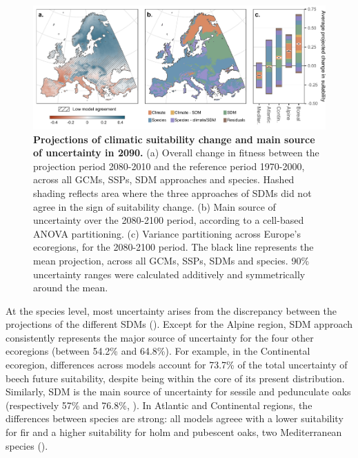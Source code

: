 \begin{figure}[hp]
\centering
\begin{subcaptiongroup}
\label{fig:anova2090A} 
\label{fig:anova2090B}
\label{fig:anova2090C}
\end{subcaptiongroup}
\includegraphics{chapter4/figs/anova_across_species_bycell-1.pdf}
\caption{\textbf{Projections of climatic suitability change and main source of uncertainty in 2090.} (a) Overall change in fitness between the projection period 2080-2010 and the reference period 1970-2000, across all GCMs, SSPs, SDM approaches and species. Hashed shading reflects area where the three approaches of SDMs did not agree in the sign of suitability change. (b) Main source of uncertainty over the 2080-2100 period, according to a cell-based ANOVA partitioning. (c) Variance partitioning across Europe's ecoregions, for the 2080-2100 period. The black line represents the mean projection, across all GCMs, SSPs, SDMs and species. 90\% uncertainty ranges were calculated additively and symmetrically around the mean.}
\label{fig:anova2090}
\end{figure}

At the species level, most uncertainty arises from the discrepancy between the projections of the different SDMs (). Except for the Alpine region, SDM approach consistently represents the major source of uncertainty for the four other ecoregions (between 54.2\% and 64.8\%). For example, in the Continental ecoregion, differences across models account for 73.7\% of the total uncertainty of beech future suitability, despite being within the core of its present distribution. Similarly, SDM is the main source of uncertainty for sessile and pedunculate oaks (respectively 57\% and 76.8\%, ). In Atlantic and Continental regions, the differences between species are strong: all models agreee with a lower suitability for fir and a higher suitability for holm and pubescent oaks, two Mediterranean species (). 

